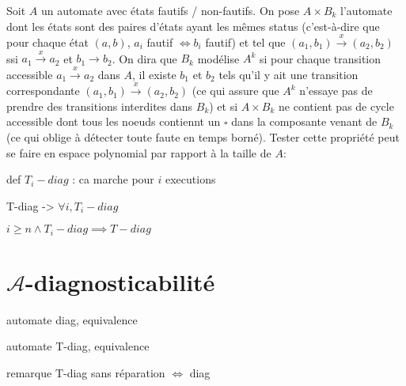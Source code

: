 \documentclass[10pt,a4paper]{article}
\newcommand{\es}{\square}
\begin{document}
Soit $A$ un automate avec états fautifs / non-fautifs. On pose $A\times B_k$ l'automate dont les états sont des paires d'états ayant les mêmes status (c'est-à-dire que pour chaque état $(a, b)$, $a_i$ fautif $\iff b_i$ fautif) et tel que $(a_1,b_1)\overset{x}{\to}(a_2, b_2)$ ssi $a_1\overset{x}{\to} a_2$ et $b_1 \to b_2$. On dira que $B_k$ modélise $A^k$ si pour chaque transition accessible $a_1\overset{x}{\to} a_2$ dans $A$, il existe $b_1$ et $b_2$ tels qu'il y ait une transition correspondante $(a_1,b_1)\overset{x}{\to}(a_2, b_2)$ (ce qui assure que $A^k$ n'essaye pas de prendre des transitions interdites dans $B_k$) et si $A\times B_k$ ne contient pas de cycle accessible dont tous les noeuds contiennt un $\es$ dans la composante venant de $B_k$ (ce qui oblige à détecter toute faute en temps borné). Tester cette propriété peut se faire en espace polynomial par rapport à la taille de $A$: 

def $T_i-diag$ : ca marche pour $i$ executions

T-diag -> $\forall i, T_i-diag$

$i\ge n \land T_i-diag \implies T-diag$


\section{$\mathcal{A}$-diagnosticabilit\'e}

automate diag, equivalence

automate T-diag, equivalence

remarque T-diag sans r\'eparation $ \iff $ diag
\end{document}
